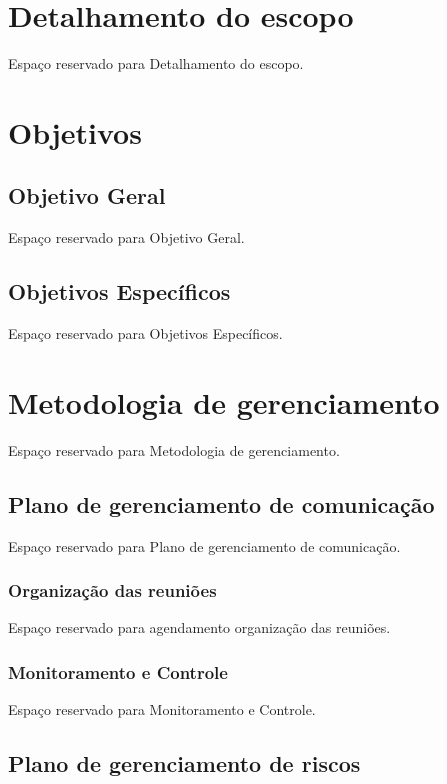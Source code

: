 \section{Detalhamento do escopo}
 
 Espaço reservado para Detalhamento do escopo.

\section{Objetivos}

\subsection{Objetivo Geral}

Espaço reservado para Objetivo Geral.

\subsection{Objetivos Específicos}

Espaço reservado para Objetivos Específicos.

\section{Metodologia de gerenciamento}

Espaço reservado para Metodologia de gerenciamento.

\subsection{Plano de gerenciamento de comunicação}

Espaço reservado para Plano de gerenciamento de comunicação.

\subsubsection{Organização das reuniões}

Espaço reservado para agendamento organização das reuniões.

\subsubsection{Monitoramento e Controle}


Espaço reservado para Monitoramento e Controle.

\subsection{Plano de gerenciamento de riscos}

